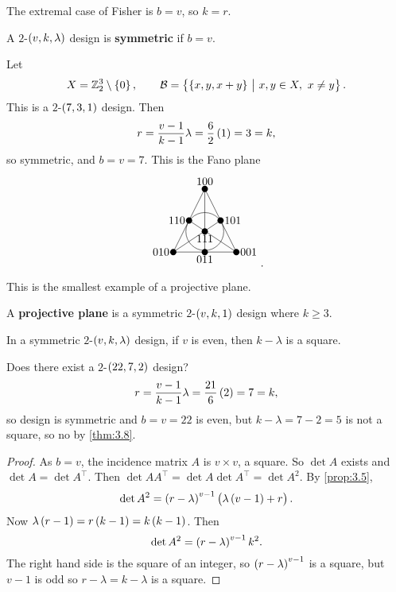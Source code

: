 The extremal case of Fisher is $ b = v $, so $ k = r $.

\begin{definition*}
A $ 2 $-$ \br{v, k, \lambda} $ design is \textbf{symmetric} if $ b = v $.
\end{definition*}

\begin{example*}
Let
$$ X = \ZZ_2^3 \setminus \cbr{0}, \qquad \BBB = \cbr{\cbr{x, y, x + y} \st x, y \in X, \ x \ne y}. $$
This is a $ 2 $-$ \br{7, 3, 1} $ design. Then
$$ r = \dfrac{v - 1}{k - 1}\lambda = \dfrac{6}{2}\br{1} = 3 = k, $$
so symmetric, and $ b = v = 7 $. This is the Fano plane
$$
\begin{tikzpicture}
\fill (0, 0) circle (0.1) node[above]{$ 100 $};
\fill (-0.5, -1) circle (0.1) node[left]{$ 110 $};
\fill (0.5, -1) circle (0.1) node[right]{$ 101 $};
\fill (0, -1.35) circle (0.1) node[below]{$ 111 $};
\fill (-1, -2) circle (0.1) node[left]{$ 010 $};
\fill (0, -2) circle (0.1) node[below]{$ 011 $};
\fill (1, -2) circle (0.1) node[right]{$ 001 $};
\draw (0, 0) to (-1, -2);
\draw (0, 0) to (0, -2);
\draw (0, 0) to (1, -2);
\draw (-0.5, -1) to (1, -2);
\draw (0.5, -1) to (-1, -2);
\draw (-1, -2) to (1, -2);
\draw (0, -1.35) circle (0.6);
\end{tikzpicture}.
$$
\end{example*}

\begin{note*}
This is the smallest example of a projective plane.
\end{note*}

\begin{definition*}
A \textbf{projective plane} is a symmetric $ 2 $-$ \br{v, k, 1} $ design where $ k \ge 3 $.
\end{definition*}

\begin{theorem}
\label{thm:3.8}
In a symmetric $ 2 $-$ \br{v, k, \lambda} $ design, if $ v $ is even, then $ k - \lambda $ is a square.
\end{theorem}

\begin{example*}
Does there exist a $ 2 $-$ \br{22, 7, 2} $ design?
$$ r = \dfrac{v - 1}{k - 1}\lambda = \dfrac{21}{6}\br{2} = 7 = k, $$
so design is symmetric and $ b = v = 22 $ is even, but $ k - \lambda = 7 - 2 = 5 $ is not a square, so no by \ref{thm:3.8}.
\end{example*}

\begin{proof}
As $ b = v $, the incidence matrix $ A $ is $ v \times v $, a square. So $ \det A $ exists and $ \det A = \det A^\intercal $. Then $ \det AA^\intercal = \det A\det A^\intercal = \det A^2 $. By \ref{prop:3.5},
$$ \det A^2 = \br{r - \lambda}^{v - 1}\br{\lambda\br{v - 1} + r}. $$
Now $ \lambda\br{r - 1} = r\br{k - 1} = k\br{k - 1} $. Then
$$ \det A^2 = \br{r - \lambda}^{v - 1}k^2. $$
The right hand side is the square of an integer, so $ \br{r - \lambda}^{v - 1} $ is a square, but $ v - 1 $ is odd so $ r - \lambda = k - \lambda $ is a square.
\end{proof}

